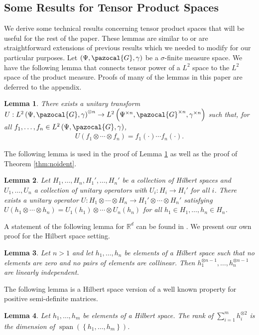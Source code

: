 \documentclass[aos,preprint]{imsart}
\def\rn{\mathbb{R}}
\def\l{\left}
\def\r{\right}
\def\sG{\pazocal{G}}
\def\spn{\operatorname{span}}
\theoremstyle{plain}
\newtheorem{lem}{Lemma}[section]
\theoremstyle{defintion}
\begin{document}
	\subsection{Some Results for Tensor Product Spaces}
	We derive some technical results concerning tensor product spaces that will be useful for the rest of the paper. These lemmas are similar to or  are straightforward extensions of previous results which we needed to modify for our particular purposes. Let $\left( \Psi, \sG, \gamma \right)$ be a $\sigma$-finite measure space. We have the following lemma that connects tensor power of a $L^2$ space to the $L^2$ space of the product measure. Proofs of many of the lemmas in this paper are deferred to the appendix. 
	\begin{lem}
		\label{lem:l2prod}
		There exists a unitary transform $U:L^2\left( \Psi, \sG, \gamma \right)^{\otimes n} \to L^2\left( \Psi^{\times n}, \sG^{\times n}, \gamma^{\times n} \right)$ such that, for all $f_1,\ldots, f_n \in L^2\left( \Psi, \sG, \gamma \right)$,
		\begin{align*}
			U\left( f_1\otimes \cdots \otimes f_n \right) = f_1(\cdot)\cdots f_n(\cdot).
		\end{align*}
	\end{lem}
	The following lemma is used in the proof of Lemma \ref{lem:l2prod} as well as the proof of Theorem \ref{thm:noident}.
	\begin{lem} \label{lem:unitprod}
		Let $H_1,\ldots, H_n, H_1',\ldots, H_n'$ be a collection of Hilbert spaces and $U_1,\ldots,U_n$ a collection of unitary operators with $U_i:H_i \to H_i'$ for all $i$. There exists a unitary operator $U:H_1 \otimes \cdots \otimes H_n \to H_1' \otimes \cdots \otimes H_n'$ satisfying $U\left( h_1 \otimes\cdots \otimes h_n \right) = U_1(h_1) \otimes \cdots \otimes U_n(h_n)$ for all $h_1 \in H_1 ,\ldots, h_n \in H_n$.
	\end{lem}
	A statement of the following lemma for $\rn^d$ can be found in \cite{symtensorrank}. We present our own proof for the Hilbert space setting.
	\begin{lem}\label{lem:linind}
		Let $n>1$ and let $h_1,\ldots, h_n$ be elements of a Hilbert space such that no elements are zero and no pairs of elements are collinear. Then $h_1^{\otimes n-1},\ldots, h_n^{\otimes n-1}$ are linearly independent.
	\end{lem}
	The following lemma is a Hilbert space version of a well known property for positive semi-definite matrices.
	\begin{lem} \label{lem:tensrank}
		Let $h_1,\ldots,h_m$ be elements of a Hilbert space. The rank of $\sum_{i=1}^m h_i^{\otimes 2}$ is the dimension of $\spn\left( \l\{h_1,\ldots,h_m \r\}\right)$.
	\end{lem}
\end{document}

